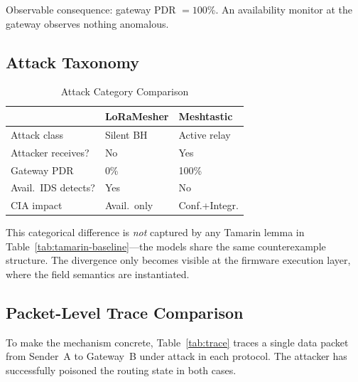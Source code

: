 \documentclass[journal]{IEEEtran}
\begin{document}
Observable consequence: gateway PDR $= 100$\%. An availability monitor at
the gateway observes nothing anomalous.

\subsection{Attack Taxonomy}

\begin{table}[h]
  \centering
  \caption{Attack Category Comparison}
  \label{tab:taxonomy}
  \begin{tabular}{p{2.4cm}p{1.8cm}p{1.8cm}}
    \toprule
    & LoRaMesher & Meshtastic \\
    \midrule
    Attack class   & Silent BH & Active relay \\
    Attacker receives? & No  & Yes \\
    Gateway PDR    & 0\% & 100\% \\
    Avail.\ IDS detects? & Yes & No \\
    CIA impact     & Avail.\ only & Conf.+Integr. \\
    \bottomrule
  \end{tabular}
\end{table}

This categorical difference is \emph{not} captured by any Tamarin lemma in
Table~\ref{tab:tamarin-baseline}---the models share the same counterexample
structure. The divergence only becomes visible at the firmware execution layer,
where the field semantics are instantiated.

\subsection{Packet-Level Trace Comparison}

To make the mechanism concrete, Table~\ref{tab:trace} traces a single data
packet from Sender~A to Gateway~B under attack in each protocol.
The attacker has successfully poisoned the routing state in both cases.
\end{document}
